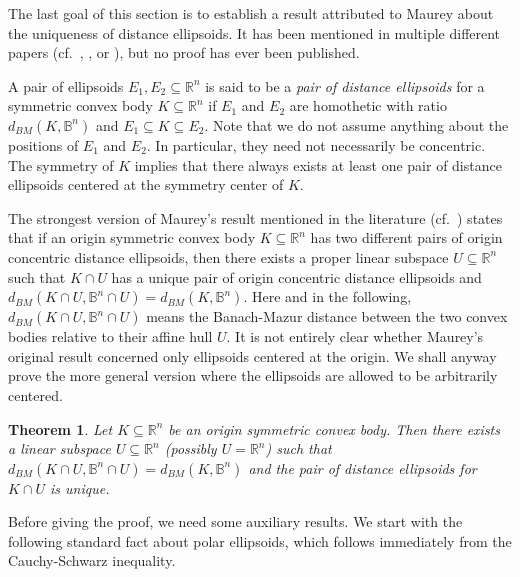 \documentclass[12pt,a4paper]{article}
\newtheorem{twr}{Theorem}[section]
\theoremstyle{definition}
\newcommand\R{\mathbb{R}}
\newcommand\B{\mathbb{B}}
\newcommand\cemph[1]{\emph{\color{red}#1}}
\begin{document}
The last goal of this section is to establish a result attributed to Maurey about the uniqueness of distance ellipsoids. It has been mentioned in multiple different papers (cf.~\cite{tomczakstructure}, \cite[Remark~$1.2$]{arias}, or \cite[Theorem~$3.1$]{praetorius}), but no proof has ever been published.
\newpage

A pair of ellipsoids $E_1, E_2 \subseteq \R^n$ is said to be a \cemph{pair of distance ellipsoids} for a symmetric convex body $K \subseteq \R^n$ if $E_1$ and $E_2$ are homothetic with ratio $d_{BM}(K,\B^n)$ and $E_1 \subseteq K \subseteq E_2$. Note that we do not assume anything about the positions of $E_1$ and $E_2$. In particular, they need not necessarily be concentric. The symmetry of $K$ implies that there always exists at least one pair of distance ellipsoids centered at the symmetry center of $K$.

The strongest version of Maurey's result mentioned in the literature (cf.~\cite[Remark~$1.2$]{arias}) states that if an origin symmetric convex body $K \subseteq \R^n$ has two different pairs of origin concentric distance ellipsoids, then there exists a proper linear subspace $U \subseteq \R^n$ such that $K \cap U$ has a unique pair of origin concentric distance ellipsoids and $d_{BM}(K\cap U, \B^n \cap U) = d_{BM}(K,\B^n)$. Here and in the following, $d_{BM}(K \cap U,\B^n \cap U)$ means the Banach-Mazur distance between the two convex bodies relative to their affine hull $U$. It is not entirely clear whether Maurey's original result concerned only ellipsoids centered at the origin. We shall anyway prove the more general version where the ellipsoids are allowed to be arbitrarily centered.



\begin{twr}
\label{thm:maurey}
Let $K \subseteq \R^n$ be an origin symmetric convex body. Then there exists a linear subspace $U \subseteq \R^n$ (possibly $U = \R^n$) such that $d_{BM}(K \cap U, \B^n \cap U) = d_{BM}(K,\B^n)$ and the pair of distance ellipsoids for $K \cap U$ is unique.
\end{twr}



Before giving the proof, we need some auxiliary results. We start with the following standard fact about polar ellipsoids, which follows immediately from the Cauchy-Schwarz inequality.
\end{document}
